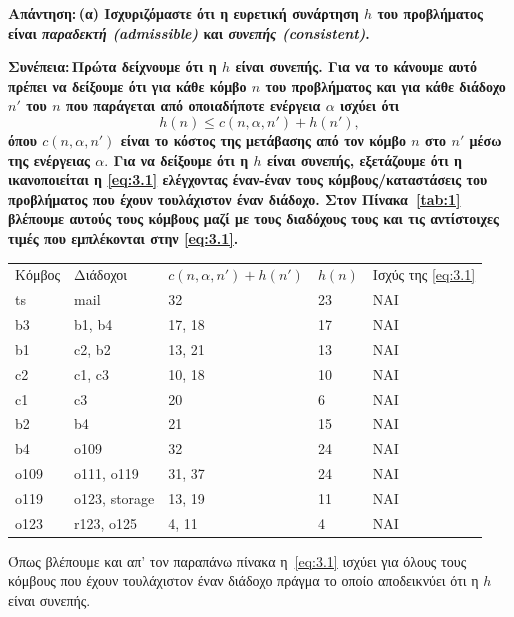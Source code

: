 \documentclass[12pt]{article}
\newcommand {\lat}{\latintext}
\theoremstyle{definition}
\begin{document}
\noindent \bf Απάντηση:\,\normalfont (α) Ισχυριζόμαστε ότι η ευρετική συνάρτηση $h$ του προβλήματος είναι \emph{παραδεκτή ({\lat admissible})} και \emph{συνεπής ({\lat consistent})}. 

\noindent \bf Συνέπεια:\,\normalfont Πρώτα δείχνουμε ότι η $h$ είναι συνεπής. Για να το κάνουμε αυτό πρέπει να δείξουμε ότι για κάθε κόμβο $n$ του προβλήματος και για κάθε διάδοχο $n'$ του $n$ που παράγεται από οποιαδήποτε ενέργεια $\alpha$ ισχύει ότι 
\[\tag{3.1}\label{eq:3.1}
h(n) \leq c(n,\alpha,n')+h(n'),
\]
\noindent όπου $c(n,\alpha,n')$ είναι το κόστος της μετάβασης από τον κόμβο $n$ στο $n'$ μέσω της ενέργειας $\alpha.$ Για να δείξουμε ότι η $h$ είναι συνεπής, εξετάζουμε ότι η ικανοποιείται η \eqref{eq:3.1} ελέγχοντας έναν-έναν τους κόμβους/καταστάσεις του προβλήματος που έχουν τουλάχιστον έναν διάδοχο. Στον Πίνακα~\ref{tab:1} βλέπουμε αυτούς τους κόμβους μαζί με τους διαδόχους τους και τις αντίστοιχες τιμές που εμπλέκονται στην \eqref{eq:3.1}.

\begin{center}
 \label{tab:1} 
\begin{tabular}{ C{0.75in} C{1in} C{1.2in} C{0.75in} C{1.2in}}\toprule[1.5pt]
Κόμβος & Διάδοχοι & $c(n,\alpha,n')+h(n')$ & $h(n)$ & Ισχύς της \eqref{eq:3.1}\\
{\lat ts} & {\lat mail} & 32 & 23 & NAI\\
{\lat b3} & {\lat b1, b4} & 17, 18 & 17 &  NAI\\
{\lat b1} & {\lat c2, b2} & 13, 21 & 13 & NAI\\
{\lat c2} & {\lat c1, c3} & 10, 18 & 10 & NAI\\
{\lat c1} & {\lat c3} & 20 & 6 & NAI\\
{\lat b2} & {\lat b4} & 21 & 15 & NAI\\
{\lat b4 } & {\lat o109} & 32 & 24 & NAI\\
{\lat o109} & {\lat o111, o119} & 31, 37 & 24 & NAI\\
{\lat o119} & {\lat o123, storage} & 13, 19 & 11 & NAI\\
{\lat o123} & {\lat r123, o125} & 4, 11 & 4 & NAI\\
\bottomrule[1.5pt]
\end{tabular}
\end{center}

\noindent Όπως βλέπουμε και απ' τον παραπάνω πίνακα η~\eqref{eq:3.1} ισχύει για όλους τους κόμβους που έχουν τουλάχιστον έναν διάδοχο πράγμα το οποίο αποδεικνύει ότι η $h$ είναι συνεπής. 
\vspace{1mm}
\end{document}
